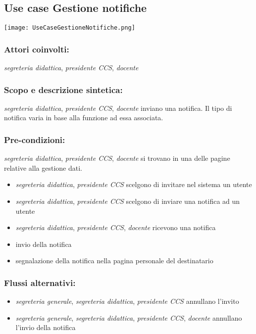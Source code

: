 \documentclass[11pt,a4paper]{article}
\begin{document}
\subsection{Use case Gestione notifiche}
\begin{center} 
 \texttt{[image: UseCaseGestioneNotifiche.png]} 
\end{center}
\subsubsection*{Attori coinvolti:}
\textit{segreteria didattica}, \textit{presidente CCS}, \textit{docente}
\subsubsection*{Scopo e descrizione sintetica:}
\textit{segreteria didattica}, \textit{presidente CCS}, \textit{docente} inviano una notifica. Il tipo di notifica varia in base alla funzione ad essa associata.
\subsubsection*{Pre-condizioni:}
\textit{segreteria didattica}, \textit{presidente CCS}, \textit{docente} si trovano in una delle pagine relative alla gestione dati.
\begin{itemize}
 \item \textit{segreteria didattica}, \textit{presidente CCS} scelgono di invitare nel sistema un utente
\item \textit{segreteria didattica}, \textit{presidente CCS} scelgono di inviare una notifica ad un utente
\item \textit{segreteria didattica}, \textit{presidente CCS}, \textit{docente} ricevono una notifica
\end{itemize}
\begin{itemize}
 \item invio della notifica
 \item segnalazione della notifica nella pagina personale del destinatario
\end{itemize}
\subsubsection*{Flussi alternativi:}
\begin{itemize}
\item \textit{segreteria generale}, \textit{segreteria didattica}, \textit{presidente CCS} annullano l'invito
\item  \textit{segreteria generale}, \textit{segreteria didattica}, \textit{presidente CCS}, \textit{docente} annullano l'invio della notifica
\end{itemize}
\end{document}
